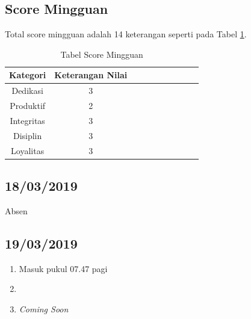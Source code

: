 \subsection{Score Mingguan}
Total score mingguan adalah 14 keterangan seperti pada Tabel \ref{table:scoremingguan2}.
\begin{table}[!ht]
\centering
\begin{tabular}{ |c|c|c|c|c|c|c|c|c|c| }
\hline
Kategori & Keterangan Nilai \\
\hline
Dedikasi & 3 \\
\hline
Produktif & 2 \\
\hline
Integritas & 3 \\
\hline
Disiplin & 3 \\
\hline
Loyalitas & 3 \\
\hline
\end{tabular}
\caption{Tabel Score Mingguan}
\label{table:scoremingguan2}
\end{table}

\subsection{18/03/2019}
Absen

\subsection{19/03/2019}
\begin{enumerate}
  \item Masuk pukul 07.47 pagi
  \item 
  \item \textit{Coming Soon}
\end{enumerate}

